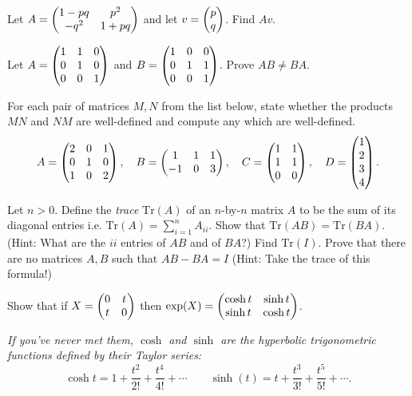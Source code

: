 \documentclass{article}
\begin{document}
\begin{Question}\label{exr:pq}
Let \(A=\begin{pmatrix} 1-pq & p^2 \\ -q^2 & 1+pq\end{pmatrix}\) and let \(v=\begin{pmatrix}
p\\ q\end{pmatrix}\). Find \(Av\). 


\end{Question}
\begin{Question}\label{exr:nc}
Let \(A=\begin{pmatrix} 1 & 1 & 0 \\ 0 & 1 & 0 \\ 0 & 0 & 1\end{pmatrix}\) and \(B=\begin{pmatrix} 1 &
0 & 0 \\ 0 & 1 & 1 \\ 0 & 0 & 1\end{pmatrix}\). Prove \(AB\neq BA\). 


\end{Question}
\begin{Question}\label{exr:matmult}
For each pair of matrices \(M,N\) from the list below, state whether
the products \(MN\) and \(NM\) are well-defined and compute
any which are well-defined. \[A=\begin{pmatrix} 2 & 0 & 1 \\ 0 & 1 & 0
\\ 1 & 0 & 2\end{pmatrix},\quad B=\begin{pmatrix} 1 & 1 & 1 \\ -1 & 0 & 3\end{pmatrix},\quad C=\begin{pmatrix} 1
& 1 \\ 1 & 1 \\ 0 & 0\end{pmatrix},\quad D=\begin{pmatrix} 1 \\ 2 \\ 3 \\ 4\end{pmatrix}.\]


\end{Question}
\begin{Question}\label{exr:trace}
Let \(n>0\). Define the {\em trace} \(\mathrm{Tr}(A)\) of an
\(n\)-by-\(n\) matrix \(A\) to be the sum of its diagonal entries
i.e. \(\mathrm{Tr}(A)=\sum_{i=1}^nA_{ii}\). Show that 
\(\mathrm{Tr}(AB)=\mathrm{Tr}(BA)\). (Hint: What are the \(ii\)
entries of \(AB\) and of \(BA\)?) Find \(\mathrm{Tr}(I)\). Prove
that there are no matrices \(A,B\) such that \(AB-BA=I\) (Hint: Take
the trace of this formula!)


\end{Question}
\begin{Question}\label{exr:exphyp}
Show that if \(X=\begin{pmatrix} 0 & t \\ t & 0 \end{pmatrix}\) then \(\exp(X)=\begin{pmatrix} \cosh t
& \sinh t \\ \sinh t & \cosh t\end{pmatrix}\).


{\em If you've never met them, \(\cosh\) and \(\sinh\) are the
hyperbolic trigonometric functions defined by their Taylor series:}
\[\cosh t=1+\frac{t^2}{2!}+\frac{t^4}{4!}+\cdots\qquad
\sinh(t)=t+\frac{t^3}{3!}+\frac{t^5}{5!}+\cdots.\]


\end{Question}
\end{document}
